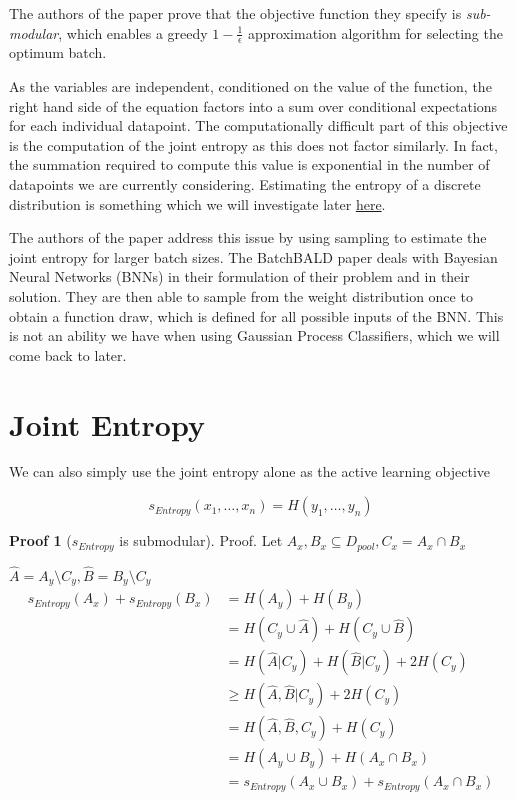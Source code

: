 \documentclass[12pt, a4paper]{report}
\theoremstyle{definition}
\theoremstyle{definition}
\theoremstyle{definition}
\newtheorem{nproof}{Proof}[section]
\begin{document}
The authors of the paper prove that the objective function they specify is \textit{sub-modular}, which enables a greedy $1 - \frac{1}{\epsilon}$ approximation algorithm for selecting the optimum batch.


As the variables are independent, conditioned on the value of the function, the right hand side of the equation factors into a sum over conditional expectations for each individual datapoint. The computationally difficult part of this objective is the computation of the joint entropy as this does not factor similarly. In fact, the summation required to compute this value is exponential in the number of datapoints we are currently considering. Estimating the entropy of a discrete distribution is something which we will investigate later \hyperref[sec:Entropy]{here}.


The authors of the paper address this issue by using sampling to estimate the joint entropy for larger batch sizes. The BatchBALD paper deals with Bayesian Neural Networks (BNNs) in their formulation of their problem and in their solution. They are then able to sample from the weight distribution once to obtain a function draw, which is defined for all possible inputs of the BNN. This is not an ability we have when using Gaussian Process Classifiers, which we will come back to later.


\section{Joint Entropy}

We can also simply use the joint entropy alone as the active learning objective

$$s_{Entropy} (x_1, \ldots, x_n) = H(y_1, \ldots, y_n)$$

\begin{nproof}[$s_{Entropy}$ is submodular]
    Proof.
    Let $A_x,B_x \subseteq D_{pool}, C_x = A_x \cap B_x$
    
    $\hat{A} = A_y \setminus C_y, \hat{B} = B_y \setminus C_y$
    \begin{align*}
        s_{Entropy} (A_x) + s_{Entropy} (B_x) &= H(A_y) + H(B_y)\\
        &= H(C_y \cup \hat{A}) + H(C_y \cup \hat{B})\\
        &= H(\hat{A} | C_y) + H(\hat{B} | C_y) + 2 H(C_y)\\
        &\geq H(\hat{A}, \hat{B} | C_y) + 2 H(C_y)\\
        &= H(\hat{A}, \hat{B}, C_y) + H(C_y)\\
        &= H(A_y \cup B_y) + H(A_x \cap B_x)\\
        &= s_{Entropy} (A_x \cup B_x) + s_{Entropy} (A_x \cap B_x)
    \end{align*}

\end{nproof}
\end{document}
